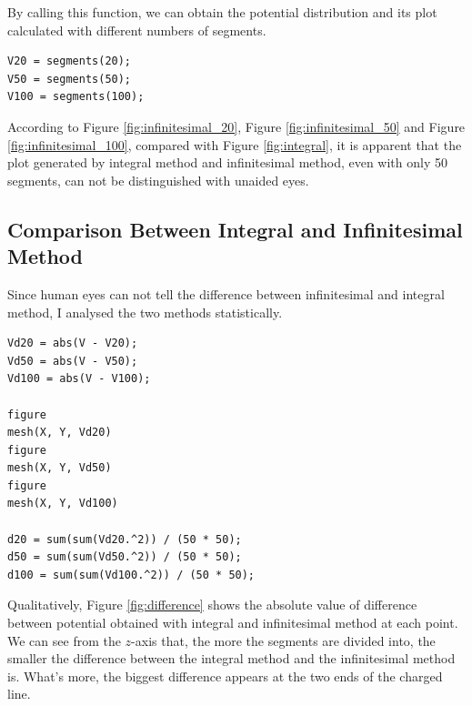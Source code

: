 \documentclass[journal]{IEEEtran}
\begin{document}
By calling this function, we can obtain the potential distribution and its plot calculated with different numbers of segments.

\begin{lstlisting}
V20 = segments(20);
V50 = segments(50);
V100 = segments(100);
\end{lstlisting}

According to Figure \ref{fig:infinitesimal_20}, Figure \ref{fig:infinitesimal_50} and Figure \ref{fig:infinitesimal_100}, compared with Figure \ref{fig:integral}, it is apparent that the plot generated by integral method and infinitesimal method, even with only 50 segments, can not be distinguished with unaided eyes.

\subsection{Comparison Between Integral and Infinitesimal Method}

Since human eyes can not tell the difference between infinitesimal and integral method, I analysed the two methods statistically.

\begin{lstlisting}
Vd20 = abs(V - V20);
Vd50 = abs(V - V50);
Vd100 = abs(V - V100);

figure
mesh(X, Y, Vd20)
figure
mesh(X, Y, Vd50)
figure
mesh(X, Y, Vd100)

d20 = sum(sum(Vd20.^2)) / (50 * 50);
d50 = sum(sum(Vd50.^2)) / (50 * 50);
d100 = sum(sum(Vd100.^2)) / (50 * 50);
\end{lstlisting}

Qualitatively, Figure \ref{fig:difference} shows the absolute value of difference between potential obtained with integral and infinitesimal method at each point. We can see from the $z$-axis that, the more the segments are divided into, the smaller the difference between the integral method and the infinitesimal method is. What's more, the biggest difference appears at the two ends of the charged line.
\end{document}

